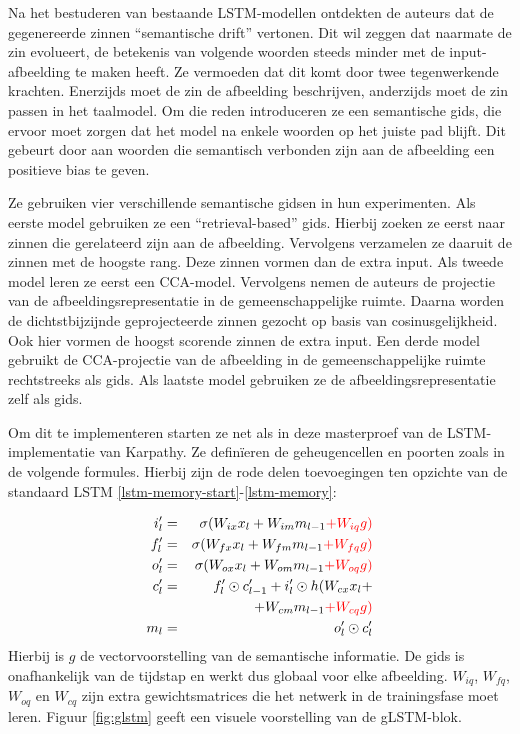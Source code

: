 Na het bestuderen van bestaande LSTM-modellen ontdekten de auteurs dat de gegenereerde zinnen ``semantische drift'' vertonen. Dit wil zeggen dat naarmate de zin evolueert, de betekenis van volgende woorden steeds minder met de input-afbeelding te maken heeft. Ze vermoeden dat dit komt door twee tegenwerkende krachten. Enerzijds moet de zin de afbeelding beschrijven, anderzijds moet de zin passen in het taalmodel. Om die reden introduceren ze een semantische gids, die ervoor moet zorgen dat het model na enkele woorden op het juiste pad blijft. Dit gebeurt door aan woorden die semantisch verbonden zijn aan de afbeelding een positieve bias te geven.

Ze gebruiken vier verschillende semantische gidsen in hun experimenten. Als eerste model gebruiken ze een ``retrieval-based'' gids. Hierbij zoeken ze eerst naar zinnen die gerelateerd zijn aan de afbeelding. Vervolgens verzamelen ze daaruit de zinnen met de hoogste rang. Deze zinnen vormen dan de extra input.
Als tweede model leren ze eerst een CCA-model. Vervolgens nemen de auteurs de projectie van de afbeeldingsrepresentatie in de gemeenschappelijke ruimte. Daarna worden de dichtstbijzijnde geprojecteerde zinnen gezocht op basis van cosinusgelijkheid. Ook hier vormen de hoogst scorende zinnen de extra input.
Een derde model gebruikt de CCA-projectie van de afbeelding in de gemeenschappelijke ruimte rechtstreeks als gids.
Als laatste model gebruiken ze de afbeeldingsrepresentatie zelf als gids.

Om dit te implementeren starten ze net als in deze masterproef van de LSTM-implementatie van Karpathy. Ze defin\"ieren de geheugencellen en poorten zoals in de volgende formules. Hierbij zijn de rode delen toevoegingen ten opzichte van de standaard LSTM \ref{lstm-memory-start}-\ref{lstm-memory}:

%
\begin{eqnarray}
\vspace{-3mm}
\label{glstm-memory-start}
i_l' & = & \sigma (W_{ix} x_l + W_{im} m_{l-1} \color{red}{+ W_{iq} g}) \label{glstm-input} \\
f_l' & = & \sigma (W_{fx} x_l + W_{fm} m_{l-1} \color{red}{+ W_{fq} g}) \\
o_l' & = & \sigma (W_{ox} x_l + W_{om} m_{l-1} \color{red}{+ W_{oq} g}) \\
c_l' & = & f_l' \odot c_{l-1}' + i_l' \odot h(W_{cx} x_l + \nonumber \\
&   & + W_{cm} m_{l-1} \color{red}{+ W_{cq} g}) \\
m_l & = & o_l' \odot c_l'
\label{glstm-memory}
\vspace{-3mm}
\end{eqnarray}
Hierbij is $g$ de vectorvoorstelling van de semantische informatie. De gids is onafhankelijk van de tijdstap en werkt dus globaal voor elke afbeelding. $W_{iq}$, $W_{fq}$, $W_{oq}$ en $W_{cq}$ zijn extra gewichtsmatrices die het netwerk in de trainingsfase moet leren. Figuur \ref{fig:glstm} geeft een visuele voorstelling van de gLSTM-blok.

